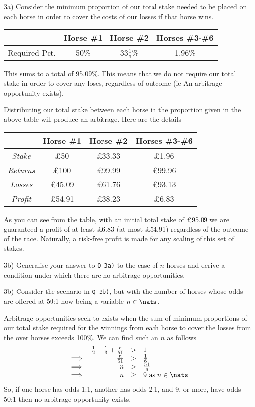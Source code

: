 \documentclass[11pt,a4paper]{article}
\begin{document}
\begin{answer}{3a)}
  Consider the minimum proportion of our total stake needed to be placed on each horse in order to cover the costs of our losses if that horse wins.
  \begin{center}
    \begin{tabular}{c|c|c|c}
      &Horse \#1&Horse \#2&Horses \#3-\#6\\\hline
      Required Pct.&50\%&33$\frac13$\%&1.96\%
    \end{tabular}
  \end{center}
  This sums to a total of 95.09\%. This means that we do not require our total stake in order to cover any loses, regardless of outcome (ie An arbitrage opportunity exists).
  \par Distributing our total stake between each horse in the proportion given in the above table will produce an arbitrage. Here are the details
  \begin{center}
    \begin{tabular}{c|c|c|c}
      &Horse \#1&Horse \#2&Horses \#3-\#6\\\hline
      \textit{Stake}&£50&£33.33&£1.96\\\hline
      \textit{Returns}&£100&£99.99&£99.96\\
      \textit{Losses}&£45.09&£61.76&£93.13\\\hline
      \textit{Profit}&£54.91&£38.23&£6.83\\\hline
    \end{tabular}
  \end{center}
  As you can see from the table, with an initial total stake of £95.09 we are guaranteed a profit of at least £6.83 (at most £54.91) regardless of the outcome of the race. Naturally, a risk-free profit is made for any scaling of this set of stakes.
\end{answer}

\begin{question}{3b)}
  Generalise your answer to \texttt{Q 3a)} to the case of $n$ horses and derive a condition under which there are no arbitrage opportunities.
\end{question}

\begin{answer}{3b)}
  Consider the scenario in \texttt{Q 3b)}, but with the number of horses whose odds are offered at 50:1 now being a variable $n\in\nats$.
  \par Arbitrage opportunities seek to exists when the sum of minimum proportions of our total stake required for the winnings from each horse to cover the losses from the over horses exceeds 100\%. We can find such an $n$ as follows
  \[\begin{array}{rrcl}
    &\frac12+\frac13+\frac{n}{51}&>&1\\
    \implies&\frac{n}{51}&>&\frac16\\
    \implies&n&>&\frac{51}6\\
    \implies&n&\geq&9\text{ as }n\in\nats
  \end{array}\]
  So, if one horse has odds 1:1, another has odds 2:1, and 9, or more, have odds 50:1 then no arbitrage opportunity exists.
\end{answer}
\end{document}
